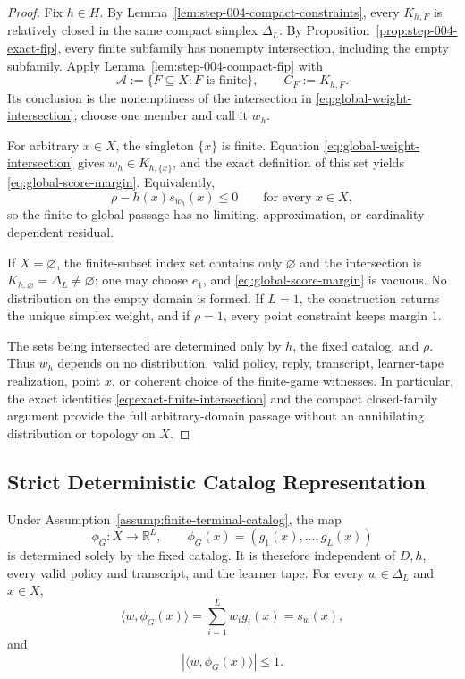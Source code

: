 \begin{proof}
Fix $h\in H$.  By Lemma~\ref{lem:step-004-compact-constraints}, every
$K_{h,F}$ is relatively closed in the same compact simplex $\Delta_L$.
By Proposition~\ref{prop:step-004-exact-fip}, every finite subfamily has
nonempty intersection, including the empty subfamily.  Apply
Lemma~\ref{lem:step-004-compact-fip} with
\[
\mathcal A:=\{F\subseteq X:F\text{ is finite}\},
\qquad C_F:=K_{h,F}.
\]
Its conclusion is the nonemptiness of the intersection in
\eqref{eq:global-weight-intersection}; choose one member and call it $w_h$.

For arbitrary $x\in X$, the singleton $\{x\}$ is finite.  Equation
\eqref{eq:global-weight-intersection} gives
$w_h\in K_{h,\{x\}}$, and the exact definition of this set yields
\eqref{eq:global-score-margin}.  Equivalently,
\[
\rho-h(x)s_{w_h}(x)\le0
\qquad\text{for every }x\in X,
\]
so the finite-to-global passage has no limiting, approximation, or
cardinality-dependent residual.

If $X=\varnothing$, the finite-subset index set contains only
$\varnothing$ and the intersection is
$K_{h,\varnothing}=\Delta_L\ne\varnothing$; one may choose $e_1$, and
\eqref{eq:global-score-margin} is vacuous.  No distribution on the empty
domain is formed.  If $L=1$, the construction returns the unique simplex
weight, and if $\rho=1$, every point constraint keeps margin $1$.

The sets being intersected are determined only by $h$, the fixed catalog,
and $\rho$.  Thus $w_h$ depends on no distribution, valid policy, reply,
transcript, learner-tape realization, point $x$, or coherent choice of the
finite-game witnesses.  In particular, the exact identities
\eqref{eq:exact-finite-intersection} and the compact closed-family argument
provide the full arbitrary-domain passage without an annihilating
distribution or topology on $X$.
\end{proof}

\subsection{Strict Deterministic Catalog Representation}
\label{app:strict-catalog-representation}

\begin{lemma}
\label{lem:step-005-coordinate-identity}
Under Assumption~\ref{assump:finite-terminal-catalog}, the map
\[
\phi_G:X\longrightarrow\mathbb R^L,
\qquad \phi_G(x)=(g_1(x),\ldots,g_L(x))
\]
is determined solely by the fixed catalog.  It is therefore independent of
$D,h$, every valid policy and transcript, and the learner tape.  For every
$w\in\Delta_L$ and $x\in X$,
\begin{equation}\label{eq:coordinate-score-identity}
\langle w,\phi_G(x)\rangle
=\sum_{i=1}^Lw_i g_i(x)=s_w(x),
\end{equation}
and
\begin{equation}\label{eq:mixture-score-bound}
|\langle w,\phi_G(x)\rangle|\le1.
\end{equation}
\end{lemma}

